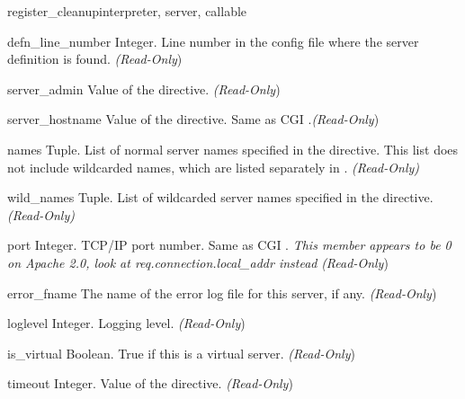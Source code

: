 \begin{funcdesc}{register_cleanup}{interpreter, server, callable}
\begin{memberdesc}[server]{defn_line_number}
  Integer. Line number in the config file where the server definition is
  found.
  \emph{(Read-Only})
\end{memberdesc}

\begin{memberdesc}[server]{server_admin}
  Value of the  directive. 
  \emph{(Read-Only})
\end{memberdesc}

\begin{memberdesc}[server]{server_hostname}
  Value of the  directive. Same as CGI .\emph{(Read-Only})
\end{memberdesc}

\begin{memberdesc}[server]{names}
  Tuple. List of normal server names specified in the  
  directive.  This list does not include wildcarded names, which are listed
  separately in . \emph{(Read-Only)}
\end{memberdesc}

\begin{memberdesc}[server]{wild_names}
  Tuple. List of wildcarded server names specified in the 
  directive. \emph{(Read-Only)}
\end{memberdesc}

\begin{memberdesc}[server]{port}
  Integer. TCP/IP port number. Same as CGI .
  \emph{This member appears to be 0 on Apache 2.0, look at req.connection.local_addr instead}
  \emph{(Read-Only})
\end{memberdesc}

\begin{memberdesc}[server]{error_fname}
  The name of the error log file for this server, if any.
  \emph{(Read-Only})
\end{memberdesc}

\begin{memberdesc}[server]{loglevel}
  Integer. Logging level.
  \emph{(Read-Only})
\end{memberdesc}

\begin{memberdesc}[server]{is_virtual}
  Boolean. True if this is a virtual server.
  \emph{(Read-Only})
\end{memberdesc}

\begin{memberdesc}[server]{timeout}
  Integer. Value of the  directive.
  \emph{(Read-Only})
\end{memberdesc}


\end{funcdesc}
